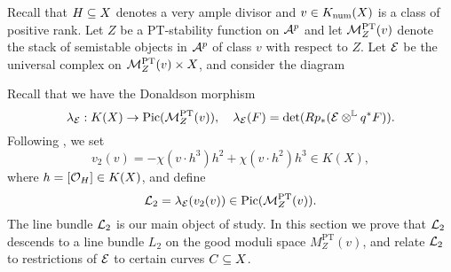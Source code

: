 Recall that $H \subseteq X$ denotes a very ample divisor and $v \in K_{\mathrm{num}}(X)$ is a class of positive rank. Let $Z$ be a PT-stability function on $\mathcal{A}^p$ and let $\mathcal{M}^{\text{PT}}_Z(v)$ denote the stack of semistable objects in $\mathcal{A}^p$ of class $v$ with respect to $Z$. Let $\mathcal{E}$ be the universal complex on $\mathcal{M}^{\text{PT}}_Z(v) \times X$, and consider the diagram
\begin{center}
\end{center}
Recall that we have the Donaldson morphism
\[ \lambda_{\mathcal{E}}: K(X) \to \mathrm{Pic}(\mathcal{M}^{\text{PT}}_Z(v)), \quad \lambda_{\mathcal{E}}(F) = \det(R p_*(\mathcal{E} \otimes^{\mathbb{L}} q^*F)). \]
Following \cite[Example 8.1.8 (iii)]{HL}, we set
\[ v_2(v) = -\chi(v \cdot h^3) h^2 + \chi(v \cdot h^2) h^3 \in K(X), \]
where $h = [\mathcal{O}_H] \in K(X)$, and define
\[ \mathcal{L}_2 = \lambda_{\mathcal{E}}(v_2(v)) \in \mathrm{Pic}(\mathcal{M}^{\text{PT}}_Z(v)). \]
The line bundle $\mathcal{L}_2$ is our main object of study. In this section we prove that $\mathcal{L}_2$ descends to a line bundle $L_2$ on the good moduli space $M^{\text{PT}}_Z(v)$, and relate $\mathcal{L}_2$ to restrictions of $\mathcal{E}$ to certain curves $C \subseteq X$. 

